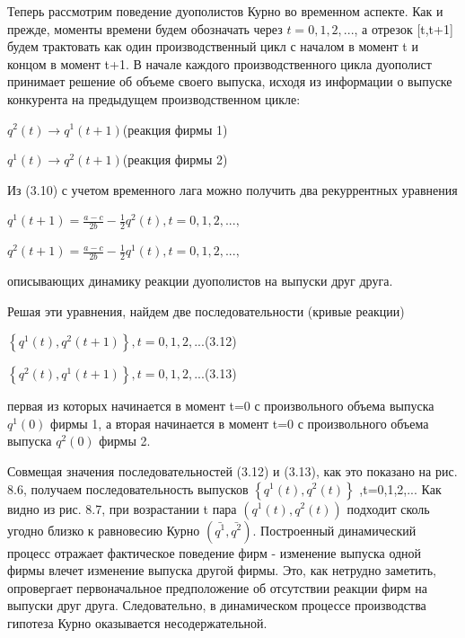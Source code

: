 \documentclass[12pt, 4paper]{book}
\begin{document}
{Теперь рассмотрим поведение дуополистов Курно во временном аспекте. Как и прежде, моменты времени будем обозначать через $t=0,1,2,...$, а отрезок [t,t+1] будем трактовать как один производственный цикл с началом в момент t и концом в момент t+1. В начале каждого производственного цикла дуополист принимает решение об объеме своего выпуска, исходя из информации о выпуске конкурента на предыдущем производственном цикле:
\begin{center}
$q^2(t) \rightarrow q^1(t+1)$(реакция фирмы 1)
\end{center}
\begin{center}
$q^1(t) \rightarrow q^2(t+1)$(реакция фирмы 2)
\end{center}
Из (3.10) с учетом временного лага можно получить два рекуррентных уравнения
\begin{center}
$q^1(t+1)=\frac{a-c}{2b}-\frac{1}{2}q^2(t),t=0,1,2,...,$ 
\end{center}
\begin{center}
$q^2(t+1)=\frac{a-c}{2b}-\frac{1}{2}q^1(t),t=0,1,2,...,$ 
\end{center}
описывающих динамику реакции дуополистов на выпуски друг друга.
\par

Решая эти уравнения, найдем две последовательности (кривые реакции)
\begin{center}
$\left\{q^1(t),q^2(t+1) \right\}, t=0,1,2,...$(3.12)
\end{center}
\begin{center}
$\left\{q^2(t),q^1(t+1) \right\}, t=0,1,2,...$(3.13)
\end{center}
первая из которых начинается в момент t=0 с произвольного объема выпуска $q^1(0)$ фирмы 1, а вторая начинается в момент t=0 с произвольного объема выпуска $q^2(0)$ фирмы 2.
\par

Совмещая значения последовательностей (3.12) и (3.13), как это показано на рис. 8.6, получаем последовательность выпусков $\left\{q^1(t),q^{2}(t)\right\}$ ,t=0,1,2,... 
Как видно из рис. 8.7, при возрастании t пара $(q^1(t),q^2(t))$ подходит сколь угодно близко к равновесию Курно $(\bar{q^1},\bar{q^2})$.
Построенный динамический процесс отражает фактическое поведение фирм - изменение выпуска одной фирмы влечет изменение выпуска другой фирмы. Это, как нетрудно заметить, опровергает первоначальное предположение об отсутствии реакции фирм на выпуски друг друга. Следовательно, в динамическом процессе производства гипотеза Курно оказывается несодержательной.
\newpage
\begin{center}

\end{center}}
\end{document}
